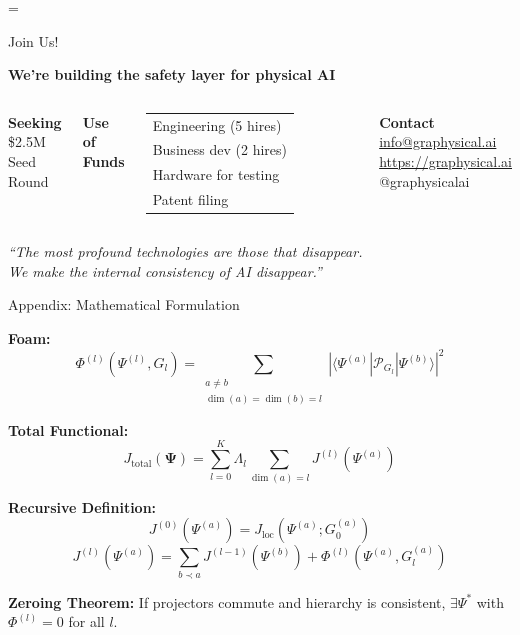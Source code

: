 \documentclass{beamer}
\begin{document}
=%

\begin{frame}{Join Us!}

\begin{center}
\Large \textbf{We're building the safety layer for physical AI}
\end{center}

\vspace{1cm}

\begin{columns}[t]
\centering
\textbf{Seeking}\\
\large \$2.5M\\
Seed Round

\centering
\textbf{Use of Funds}\\
\begin{tabular}{l}
Engineering (5 hires)\\
Business dev (2 hires)\\
Hardware for testing\\
Patent filing
\end{tabular}

\centering
\textbf{Contact}\\
\url{info@graphysical.ai}\\
\url{https://graphysical.ai}\\
@graphysicalai
\end{columns}

\vspace{1cm}
\centering
\textit{“The most profound technologies are those that disappear.} \\
\textit{We make the internal consistency of AI disappear.”}
\end{frame}


\begin{frame}{Appendix: Mathematical Formulation}

\textbf{Foam:}
$$\Phi^{(l)}(\Psi^{(l)}, G_l) = \sum_{\substack{a\neq b \\ \dim(a)=\dim(b)=l}} |\langle \Psi^{(a)} | \mathcal{P}_{G_l} | \Psi^{(b)} \rangle|^2$$

\textbf{Total Functional:}
$$J_{\text{total}}(\mathbf{\Psi}) = \sum_{l=0}^K \Lambda_l \sum_{\dim(a)=l} J^{(l)}(\Psi^{(a)})$$

\textbf{Recursive Definition:}
$$J^{(0)}(\Psi^{(a)}) = J_{\text{loc}}(\Psi^{(a)}; G_0^{(a)})$$
$$J^{(l)}(\Psi^{(a)}) = \sum_{b\prec a} J^{(l-1)}(\Psi^{(b)}) + \Phi^{(l)}(\Psi^{(a)}, G_l^{(a)})$$

\textbf{Zeroing Theorem:} If projectors commute and hierarchy is consistent, $\exists \Psi^*$ with $\Phi^{(l)}=0$ for all $l$.
\end{frame}
\end{document}
